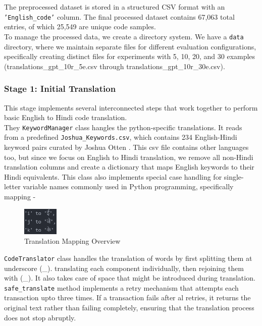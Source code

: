 \documentclass[11pt,a4paper]{article}
\begin{document}
The preprocessed dataset is stored in a structured CSV format with an \texttt{'English\_code'} column. The final processed dataset contains 67,063 total entries, of which 25,549 are unique code samples.\\ 

To manage the processed data, we create a directory system. We have a \texttt{data} directory, where we maintain separate files for different evaluation configurations, specifically creating distinct files for experiments with 5, 10, 20, and 30 examples (translations\_gpt\_10r\_5e.csv through translations\_gpt\_10r\_30e.csv).

\subsubsection{Stage 1: Initial Translation}
 This stage implements several interconnected steps that work together to perform basic English to Hindi code translation.\\

 They \texttt{KeywordManager} class hangles the python-specific translations. It reads from a predefined \texttt{Joshua\_Keywords.csv}, which contains 234 English-Hindi keyword pairs curated by Joshua Otten \cite{otten2023unipy}. This csv file contains other languages too, but since we focus on English to Hindi translation, we remove all non-Hindi translation columns and create a dictionary that maps English keywords to their Hindi equivalents. This class also implements special case handling for single-letter variable names commonly used in Python programming, specifically mapping -
 \begin{figure}
    \centering
    \includegraphics[width=0.15\textwidth]{Images/ijk-mappings.png}
    \caption{Translation Mapping Overview}
    \label{fig:translation_system}
\end{figure}
\texttt{CodeTranslator} class handles the translation of words by first splitting them at underscore (\_). translating each component individually, then rejoining them with (\_). It also takes care of space that might be introduced during translation.\\ 

\texttt{safe\_translate} method implements a retry mechanism that attempts each transaction upto three times. If a transaction fails after al retries, it returns the original text rather than failing completely, ensuring that the translation process does not stop abruptly.\\ 
\end{document}
